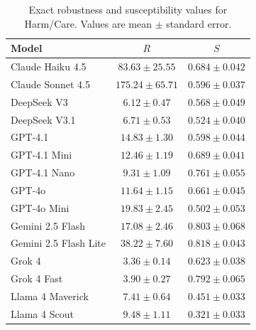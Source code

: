 \begin{table}[p!]
  \centering
  \caption{Exact robustness and susceptibility values for Harm/Care. Values are mean $\pm$ standard error.}
  \label{tab:metric_values_harm_care}
  \small
  \begin{tabular}{lcc}
    \toprule
    Model & $R$ & $S$ \\
    \midrule
    Claude Haiku 4.5 & $83.63 \pm 25.55$ & $0.684 \pm 0.042$ \\
    Claude Sonnet 4.5 & $175.24 \pm 65.71$ & $0.596 \pm 0.037$ \\
    DeepSeek V3 & $6.12 \pm 0.47$ & $0.568 \pm 0.049$ \\
    DeepSeek V3.1 & $6.71 \pm 0.53$ & $0.524 \pm 0.040$ \\
    GPT-4.1 & $14.83 \pm 1.30$ & $0.598 \pm 0.044$ \\
    GPT-4.1 Mini & $12.46 \pm 1.19$ & $0.689 \pm 0.041$ \\
    GPT-4.1 Nano & $9.31 \pm 1.09$ & $0.761 \pm 0.055$ \\
    GPT-4o & $11.64 \pm 1.15$ & $0.661 \pm 0.045$ \\
    GPT-4o Mini & $19.83 \pm 2.45$ & $0.502 \pm 0.053$ \\
    Gemini 2.5 Flash & $17.08 \pm 2.46$ & $0.803 \pm 0.068$ \\
    Gemini 2.5 Flash Lite & $38.22 \pm 7.60$ & $0.818 \pm 0.043$ \\
    Grok 4 & $3.36 \pm 0.14$ & $0.623 \pm 0.038$ \\
    Grok 4 Fast & $3.90 \pm 0.27$ & $0.792 \pm 0.065$ \\
    Llama 4 Maverick & $7.41 \pm 0.64$ & $0.451 \pm 0.033$ \\
    Llama 4 Scout & $9.48 \pm 1.11$ & $0.321 \pm 0.033$ \\
    \bottomrule
  \end{tabular}
\end{table}

